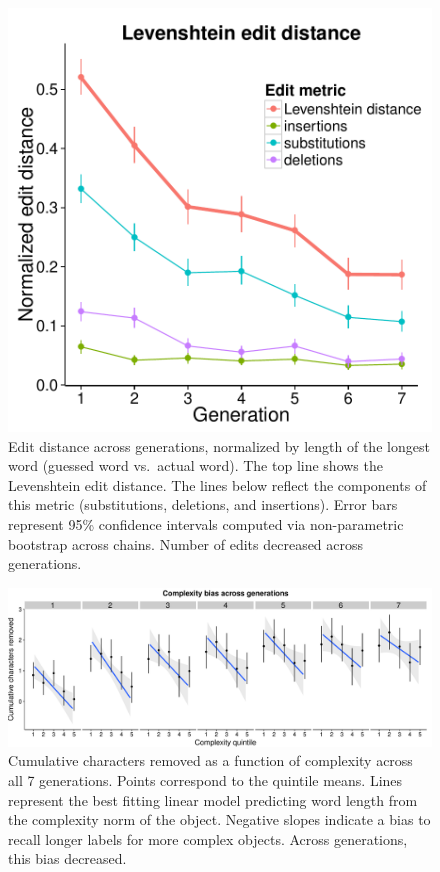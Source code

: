 \begin{figure}[t]
\begin{center}
\includegraphics[width = .7\linewidth]{figs/lev.pdf}
\end{center}
\vspace{-.5em}
\caption{Edit distance across generations, normalized by length of the longest word (guessed word vs.\ actual word). The top line shows the Levenshtein edit distance. The lines below reflect the components of this metric (substitutions, deletions, and insertions). Error bars represent 95\% confidence intervals computed via non-parametric bootstrap across chains. Number of edits decreased across generations.}
\label{fig:lev}
\vspace{-1em}
\end{figure}

\begin{figure}[t]
\begin{center}
\includegraphics[scale = .4]{figs/complexity_bias.pdf}
\end{center}
\vspace{-.5em}

\caption{Cumulative characters removed as a function of complexity across all 7 generations. Points correspond to the quintile means. Lines represent the best fitting linear model predicting word length from the complexity norm of the object. Negative slopes indicate a bias to recall longer labels for  more complex objects. Across generations, this bias decreased.}
\label{fig:cbias}
\vspace{-1em}
\end{figure}

